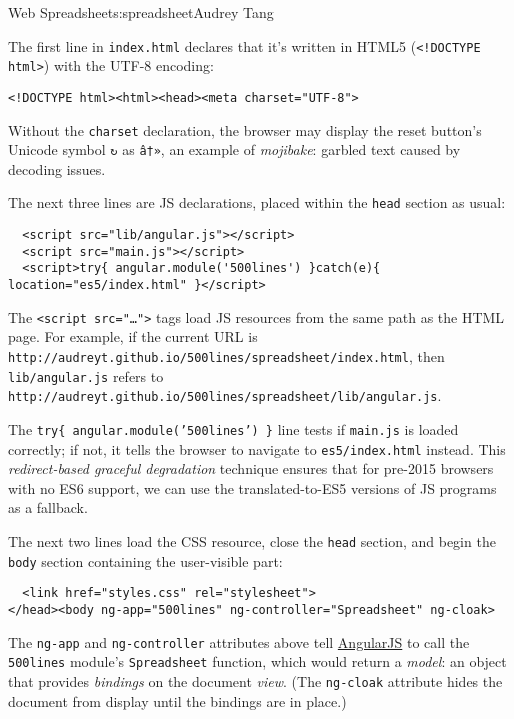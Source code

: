 \begin{aosachapter}{Web Spreadsheet}{s:spreadsheet}{Audrey Tang}
\label{html}

The first line in \texttt{index.html} declares that it's written in
HTML5 (\texttt{\textless{}!DOCTYPE html\textgreater{}}) with the UTF-8
encoding:

\begin{verbatim}
<!DOCTYPE html><html><head><meta charset="UTF-8">
\end{verbatim}

Without the \texttt{charset} declaration, the browser may display the
reset button's Unicode symbol \texttt{↻} as \texttt{â†»}, an example of
\emph{mojibake}: garbled text caused by decoding issues.

The next three lines are JS declarations, placed within the
\texttt{head} section as usual:

\begin{verbatim}
  <script src="lib/angular.js"></script>
  <script src="main.js"></script>
  <script>try{ angular.module('500lines') }catch(e){ location="es5/index.html" }</script>
\end{verbatim}

The \texttt{\textless{}script src="\ldots{}"\textgreater{}} tags load JS
resources from the same path as the HTML page. For example, if the
current URL is
\texttt{http://audreyt.github.io/500lines/spreadsheet/index.html}, then
\texttt{lib/angular.js} refers to
\texttt{http://audreyt.github.io/500lines/spreadsheet/lib/angular.js}.

The \texttt{try\{ angular.module('500lines') \}} line tests if
\texttt{main.js} is loaded correctly; if not, it tells the browser to
navigate to \texttt{es5/index.html} instead. This \emph{redirect-based
graceful degradation} technique ensures that for pre-2015 browsers with
no ES6 support, we can use the translated-to-ES5 versions of JS programs
as a fallback.

The next two lines load the CSS resource, close the \texttt{head}
section, and begin the \texttt{body} section containing the user-visible
part:

\begin{verbatim}
  <link href="styles.css" rel="stylesheet">
</head><body ng-app="500lines" ng-controller="Spreadsheet" ng-cloak>
\end{verbatim}

The \texttt{ng-app} and \texttt{ng-controller} attributes above tell
\href{http://angularjs.org/}{AngularJS} to call the \texttt{500lines}
module's \texttt{Spreadsheet} function, which would return a
\emph{model}: an object that provides \emph{bindings} on the document
\emph{view}. (The \texttt{ng-cloak} attribute hides the document from
display until the bindings are in place.)


\end{aosachapter}
